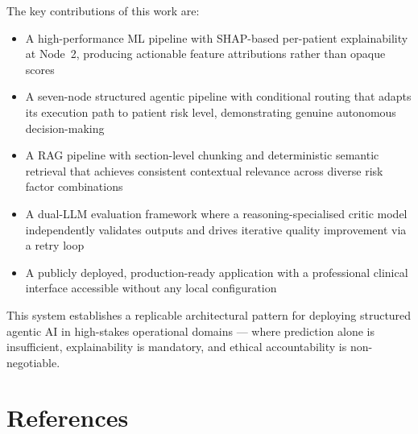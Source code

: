 \documentclass[12pt, a4paper]{report}
\begin{document}
The key contributions of this work are:

\begin{itemize}
  \item A high-performance ML pipeline with SHAP-based per-patient explainability at Node~2, producing actionable feature attributions rather than opaque scores
  \item A seven-node structured agentic pipeline with conditional routing that adapts its execution path to patient risk level, demonstrating genuine autonomous decision-making
  \item A RAG pipeline with section-level chunking and deterministic semantic retrieval that achieves consistent contextual relevance across diverse risk factor combinations
  \item A dual-LLM evaluation framework where a reasoning-specialised critic model independently validates outputs and drives iterative quality improvement via a retry loop
  \item A publicly deployed, production-ready application with a professional clinical interface accessible without any local configuration
\end{itemize}

This system establishes a replicable architectural pattern for deploying structured agentic AI in high-stakes operational domains --- where prediction alone is insufficient, explainability is mandatory, and ethical accountability is non-negotiable.

\section{References}
\end{document}
